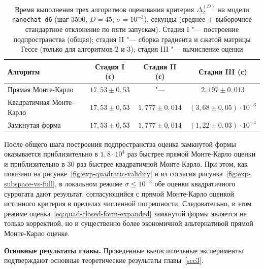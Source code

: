 \begin{table}[ht]
    \centering
    \caption{Время выполнения трех алгоритмов оценивания критерия $\Delta_2^{(D)}$ на модели \texttt{nanochat d6} (шаг $3500$, $D=45$, $\sigma=10^{-3}$), секунды (среднее $\pm$ выборочное стандартное отклонение по пяти запускам). Стадия I "--- построение подпространства (общая); стадия II "--- сборка градиента и сжатой матрицы Гессе (только для алгоритмов 2 и 3); стадия III "--- вычисление оценки}
    \label{tab:exp-runtimes}
    \begin{tabular}{@{}lccc@{}}
        \toprule
        Алгоритм & Стадия I (с) & Стадия II (с) & Стадия III (с) \\
        \midrule
        Прямая Монте-Карло & $17{,}53 \pm 0{,}53$ & "--- & $2{,}197 \pm 0{,}013$ \\
        Квадратичная Монте-Карло & $17{,}53 \pm 0{,}53$ & $1{,}777 \pm 0{,}014$ & $(3{,}68 \pm 0{,}05)\cdot 10^{-3}$ \\
        Замкнутая форма & $17{,}53 \pm 0{,}53$ & $1{,}777 \pm 0{,}014$ & $(1{,}22 \pm 0{,}03)\cdot 10^{-4}$ \\
        \bottomrule
    \end{tabular}
\end{table}

После общего шага построения подпространства оценка замкнутой формы оказывается приблизительно в $1{,}8\cdot 10^4$ раз быстрее прямой Монте-Карло оценки и приблизительно в $30$ раз быстрее квадратичной Монте-Карло. При этом, как показано на рисунке~\ref{fig:exp-quadratic-validity} и из согласия рисунка~\ref{fig:exp-subspace-vs-full}, в локальном режиме $\sigma \leqslant 10^{-3}$ обе оценки квадратичного суррогата дают результат, согласующийся с прямой Монте-Карло оценкой истинного критерия в пределах численной погрешности. Следовательно, в этом режиме оценка~\eqref{eq:quad-closed-form-expanded} замкнутой формы является не только корректной, но и существенно более экономичной альтернативой прямой Монте-Карло оценке.

\textbf{Основные результаты главы.} Проведенные вычислительные эксперименты подтверждают основные теоретические результаты главы~\ref{sec3}.


